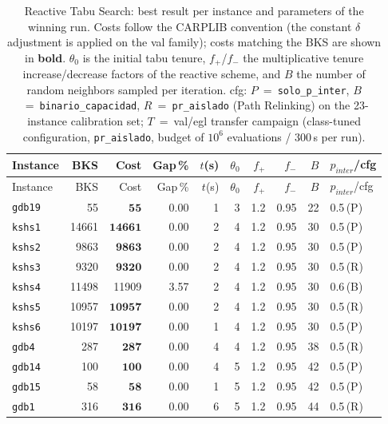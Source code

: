 \begingroup\scriptsize
\begin{longtable}{lrrrrrrrrl}
\caption{Reactive Tabu Search: best result per instance and parameters of the winning run. Costs follow the CARPLIB convention (the constant $\delta$ adjustment is applied on the val family); costs matching the BKS are shown in \textbf{bold}. $\theta_0$ is the initial tabu tenure, $f_{+}$/$f_{-}$ the multiplicative tenure increase/decrease factors of the reactive scheme, and $B$ the number of random neighbors sampled per iteration. cfg: $P$~=~\texttt{solo\_p\_inter}, $B$~=~\texttt{binario\_capacidad}, $R$~=~\texttt{pr\_aislado} (Path Relinking) on the 23-instance calibration set; $T$~=~val/egl transfer campaign (class-tuned configuration, \texttt{pr\_aislado}, budget of $10^6$ evaluations / 300\,s per run).}\label{tab:rts-per-instance}\\
\toprule
Instance & BKS & Cost & Gap\,\% & $t$(s) & $\theta_0$ & $f_{+}$ & $f_{-}$ & $B$ & $p_{inter}$/cfg \\
\midrule
\endfirsthead
\toprule
Instance & BKS & Cost & Gap\,\% & $t$(s) & $\theta_0$ & $f_{+}$ & $f_{-}$ & $B$ & $p_{inter}$/cfg \\
\midrule
\endhead
\bottomrule
\endfoot
\texttt{gdb19} & 55 & $\mathbf{55}$ & 0.00 & 1 & 3 & 1.2 & 0.95 & 22 & 0.5\,(P) \\
\texttt{kshs1} & 14661 & $\mathbf{14661}$ & 0.00 & 2 & 4 & 1.2 & 0.95 & 30 & 0.5\,(P) \\
\texttt{kshs2} & 9863 & $\mathbf{9863}$ & 0.00 & 2 & 4 & 1.2 & 0.95 & 30 & 0.5\,(P) \\
\texttt{kshs3} & 9320 & $\mathbf{9320}$ & 0.00 & 2 & 4 & 1.2 & 0.95 & 30 & 0.5\,(R) \\
\texttt{kshs4} & 11498 & 11909 & 3.57 & 2 & 4 & 1.2 & 0.95 & 30 & 0.6\,(B) \\
\texttt{kshs5} & 10957 & $\mathbf{10957}$ & 0.00 & 2 & 4 & 1.2 & 0.95 & 30 & 0.5\,(R) \\
\texttt{kshs6} & 10197 & $\mathbf{10197}$ & 0.00 & 1 & 4 & 1.2 & 0.95 & 30 & 0.5\,(P) \\
\texttt{gdb4} & 287 & $\mathbf{287}$ & 0.00 & 4 & 4 & 1.2 & 0.95 & 38 & 0.5\,(R) \\
\texttt{gdb14} & 100 & $\mathbf{100}$ & 0.00 & 4 & 5 & 1.2 & 0.95 & 42 & 0.5\,(P) \\
\texttt{gdb15} & 58 & $\mathbf{58}$ & 0.00 & 1 & 5 & 1.2 & 0.95 & 42 & 0.5\,(P) \\
\texttt{gdb1} & 316 & $\mathbf{316}$ & 0.00 & 6 & 5 & 1.2 & 0.95 & 44 & 0.5\,(R) \\

\end{longtable}
